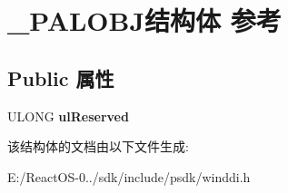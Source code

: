 \hypertarget{struct___p_a_l_o_b_j}{}\section{\+\_\+\+P\+A\+L\+O\+B\+J结构体 参考}
\label{struct___p_a_l_o_b_j}
\subsection*{Public 属性}
\begin{DoxyCompactItemize}
\item 
\mbox{\label{struct___p_a_l_o_b_j_a28aee0ac1290c319faac04603d331cbc}} 
U\+L\+O\+NG {\bfseries ul\+Reserved}
\end{DoxyCompactItemize}


该结构体的文档由以下文件生成\+:\begin{DoxyCompactItemize}
\item 
E\+:/\+React\+O\+S-\/0../sdk/include/psdk/winddi.\+h\end{DoxyCompactItemize}
